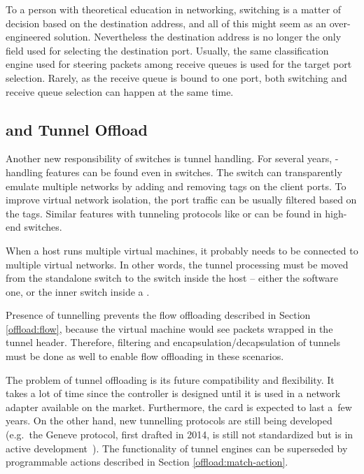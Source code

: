 To a person with theoretical education in networking, switching is a matter of
decision based on the destination  address, and all of this might seem
as an over-engineered solution. Nevertheless the destination  address is no
longer the only field used for selecting the destination port. Usually, the same
classification engine used for steering packets among receive queues is used
for the target port selection. Rarely, as the receive queue is bound to one
port, both switching and receive queue selection can happen at the same time.

\subsection{ and Tunnel Offload}

Another new responsibility of switches is tunnel handling. For several years, -handling
features can be found even in  switches. The switch can
transparently emulate multiple networks by adding and removing  tags on
the client ports. To improve virtual network isolation, the port traffic
can be usually filtered based on the  tags. Similar features with
tunneling protocols like  or  can be found in high-end switches.

When a host runs multiple virtual machines, it probably needs to be connected
to multiple virtual networks. In other words, the tunnel processing must be
moved from the standalone switch to the switch inside the host -- either the
software one, or the inner switch inside a .

Presence of tunnelling prevents the flow offloading described in Section \ref{offload:flow},
because the virtual machine would see packets wrapped in the tunnel header.
Therefore, filtering and encapsulation/decapsulation of
tunnels must be done as well to enable flow offloading in these scenarios.

The problem of tunnel offloading is its future compatibility and flexibility.
It takes a lot of time since the controller is designed until it is used in
a network adapter available on the market. Furthermore, the card is expected to
last a~few years. On the other hand, new tunnelling protocols are still being
developed (e.g.\ the Geneve protocol, first drafted in 2014, is still not
standardized but is in active development~\cite{ietf-nvo3-geneve-06}). The
functionality of tunnel engines can be superseded by programmable actions
described in Section \ref{offload:match-action}.

